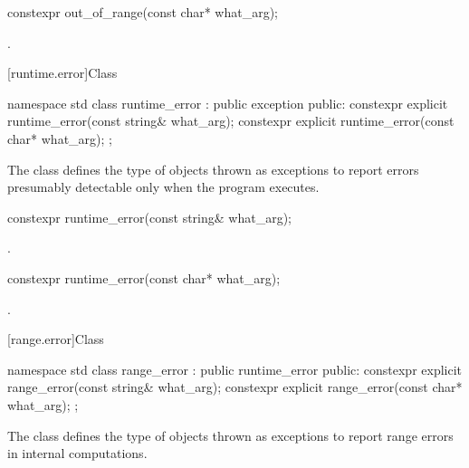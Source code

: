 %
\begin{itemdecl}
constexpr out_of_range(const char* what_arg);
\end{itemdecl}

\begin{itemdescr}
\pnum
\ensures
{}.
\end{itemdescr}

[runtime.error]{Class }

%
\begin{codeblock}
namespace std {
  class runtime_error : public exception {
  public:
    constexpr explicit runtime_error(const string& what_arg);
    constexpr explicit runtime_error(const char* what_arg);
  };
}
\end{codeblock}

\pnum
The class
defines the type of objects thrown as exceptions to report errors presumably detectable only
when the program executes.

%
\begin{itemdecl}
constexpr runtime_error(const string& what_arg);
\end{itemdecl}

\begin{itemdescr}
\pnum
\ensures
{}.
\end{itemdescr}

%
\begin{itemdecl}
constexpr runtime_error(const char* what_arg);
\end{itemdecl}

\begin{itemdescr}
\pnum
\ensures
{}.
\end{itemdescr}

[range.error]{Class }

%
\begin{codeblock}
namespace std {
  class range_error : public runtime_error {
  public:
    constexpr explicit range_error(const string& what_arg);
    constexpr explicit range_error(const char* what_arg);
  };
}
\end{codeblock}

\pnum
The class
defines the type of objects thrown as exceptions to report range errors
in internal computations.

